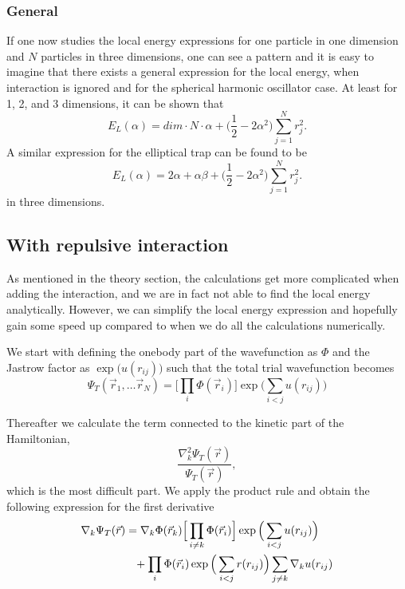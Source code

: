 \documentclass[norsk,a4paper,12pt]{article}
\begin{document}
\subsubsection{General}
If one now studies the local energy expressions for one particle in one dimension and $N$ particles in three dimensions, one can see a pattern and it is easy to imagine that there exists a general expression for the local energy, when interaction is ignored and for the spherical harmonic oscillator case. At least for 1, 2, and 3 dimensions, it can be shown that 
\begin{equation}
E_L(\alpha)=dim\cdot N\cdot \alpha+\Big(\frac{1}{2}-2\alpha^2\Big)\sum_{j=1}^Nr_j^2.
\end{equation}
A similar expression for the elliptical trap can be found to be
\begin{equation}
E_L(\alpha)=2\alpha+\alpha\beta+\Big(\frac{1}{2}-2\alpha^2\Big)\sum_{j=1}^Nr_j^2.
\end{equation}
in three dimensions.

\subsection{With repulsive interaction}
As mentioned in the theory section, the calculations get more complicated when adding the interaction, and we are in fact not able to find the local energy analytically. However, we can simplify the local energy expression and hopefully gain some speed up compared to when we do all the calculations numerically. 

We start with defining the onebody part of the wavefunction as $\Phi$ and the Jastrow factor as $\exp\big(u(r_{ij})\big)$ such that the total trial wavefunction becomes
\begin{equation}
\Psi_T(\vec{r}_1,\hdots\vec{r}_N)=\Big[\prod_i\Phi(\vec{r}_i)\Big]\exp\Big(\sum_{i<j}u(r_{ij})\Big)
\end{equation}

Thereafter we calculate the term connected to the kinetic part of the Hamiltonian,
\begin{equation}
\frac{\nabla_k^2\Psi_T(\vec{r})}{\Psi_T(\vec{r})},
\label{eq:ham_kin}
\end{equation}
which is the most difficult part. We apply the product rule and obtain the following expression for the first derivative
\begin{align}
\nabla_k\Psi_T(\vec{r})&=\nabla_k\Phi(\vec{r}_k)\Big[\prod_{i\neq k}\Phi(\vec{r}_i)\Big]\exp\Big(\sum_{i<j}u(r_{ij})\Big)\notag\\
&\phantom{=}+\prod_i\Phi(\vec{r}_i)\exp\Big(\sum_{i<j}r(r_{ij})\Big)
\sum_{j\neq k}\nabla_k u(r_{ij})
\end{align}
\end{document}
